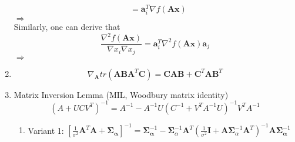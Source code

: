 \documentclass[onecolumn]{IEEEtran}
\begin{document}
\begin{enumerate}
\begin{equation}
\begin{split}
 		&=\mathbf{a}_i^T\nabla f(\mathbf{Ax})
 	\end{split}
 \end{equation}
$\Rightarrow$  \\
Similarly, one can derive that 
\[\frac{\nabla^2f(\mathbf{Ax})}{\nabla x_i\nabla x_j} = \mathbf{a}_i^T\nabla^2f(\mathbf{Ax})\mathbf{a}_j \]
$\Rightarrow$  
\item \[\nabla_{\mathbf{A}}tr(\mathbf{AB}\mathbf{A}^T\mathbf{C})=\mathbf{CAB}+\mathbf{C}^T\mathbf{AB}^T\]
\item Matrix Inversion Lemma (MIL, Woodbury matrix identity)
\[(A + UCV^T)^{-1} = A^{-1} - A^{-1}U(C^{-1} + V^TA^{-1}U)^{-1}V^TA^{-1}\]
\begin{enumerate}
	\item Variant 1: $[\frac{1}{\sigma^2}\mathbf{A}^T\mathbf{A}+\boldsymbol{\Sigma}_{\boldsymbol{\alpha}}]^{-1} = \boldsymbol{\Sigma}_{\boldsymbol{\alpha}}^{-1}-\boldsymbol{\Sigma}_\alpha^{-1} \mathbf{A}^T\left(\frac{1}{\sigma^2} \mathbf{I}+\mathbf{A} \boldsymbol{\Sigma}_\alpha^{-1} \mathbf{A}^T\right)^{-1} \mathbf{A} \boldsymbol{\Sigma}_{\boldsymbol{\alpha}}^{-1}$
\end{enumerate}
 \end{enumerate}
	\clearpage
\end{document}
